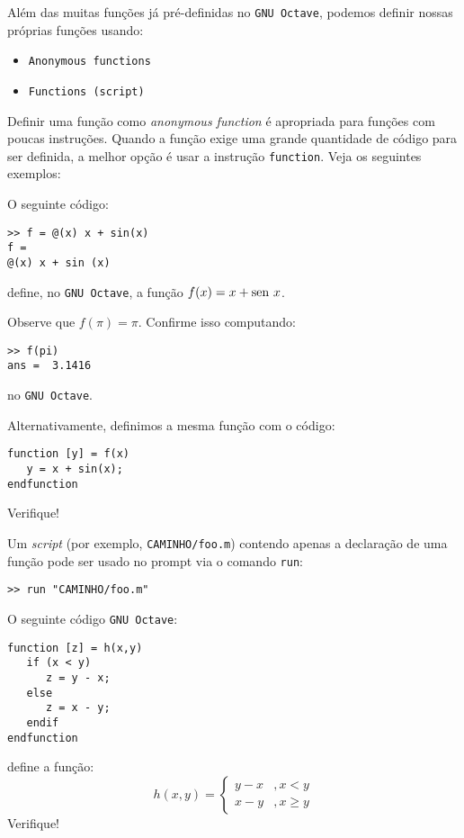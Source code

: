 Além das muitas funções já pré-definidas no \verb+GNU Octave+, podemos definir nossas próprias funções usando:
\begin{itemize}
\item \verb+Anonymous functions+
\item \verb+Functions (script)+
\end{itemize}

Definir uma função como \emph{anonymous function} é apropriada para funções com poucas instruções. Quando a função exige uma grande quantidade de código para ser definida, a melhor opção é usar a instrução \verb+function+. Veja os seguintes exemplos:

\begin{ex}
  O seguinte código:
\begin{verbatim}
>> f = @(x) x + sin(x)
f =
@(x) x + sin (x)
\end{verbatim}
define, no \verb+GNU Octave+, a função $f(x) = x + \operatorname{sen}\, x$.

Observe que $f(\pi) = \pi$. Confirme isso computando:
\begin{verbatim}
>> f(pi)
ans =  3.1416
\end{verbatim}
no \verb+GNU Octave+.

Alternativamente, definimos a mesma função com o código:
\begin{verbatim}
function [y] = f(x)
   y = x + sin(x);
endfunction
\end{verbatim}
Verifique!
\end{ex}

\begin{obs}
  Um {\it script} (por exemplo, \verb+CAMINHO/foo.m+) contendo apenas a declaração de uma função pode ser usado no prompt via o comando \verb+run+:
\begin{verbatim}
>> run "CAMINHO/foo.m"
\end{verbatim}
\end{obs}

\begin{ex}
  O seguinte código \verb+GNU Octave+:
\begin{verbatim}
function [z] = h(x,y)
   if (x < y)
      z = y - x;
   else
      z = x - y;
   endif
endfunction
\end{verbatim}
define a função:
\begin{equation*}
  h(x,y) = \left\{
    \begin{array}{ll}
      y - x &, x < y\\
      x - y &, x \geq y
    \end{array}
\right.
\end{equation*}
Verifique!
\end{ex}

